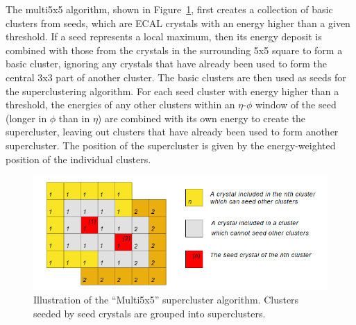 

The multi5x5 algorithm, 
shown in Figure~\ref{fig:Multi5x5SuperCluster}, 
first creates a collection 
of basic clusters from seeds, 
which are ECAL crystals with an energy higher than 
a given threshold.  
If a seed represents a local maximum, 
then its energy deposit is combined with those 
from the crystals in the surrounding 5x5 square 
to form a basic cluster, 
ignoring any crystals that have already been 
used to form the central 3x3 part of another cluster.  
The basic clusters are then used as seeds for the 
superclustering algorithm.  
For each seed cluster with energy higher than a threshold, 
the energies of any other clusters within an $\eta$-$\phi$ 
window of the seed (longer in $\phi$ than in $\eta$)
are combined with its own energy to create the supercluster, 
leaving out clusters that have already been used to 
form another supercluster. 
The position of the supercluster is given by the 
energy-weighted position of the individual clusters.  

 \begin{figure}[htb]
  \begin{center}
    \includegraphics[width=360pt]{Figures/elec-SC-multi5x5-algo.png}
  \end{center}
  \caption[\fixspacing Illustration of the ``Multi5x5'' supercluster algorithm]
	  {\fixspacing Illustration of the ``Multi5x5'' supercluster algorithm.
	    Clusters seeded by seed crystals are grouped into 
	    superclusters.  
	  }
  \label{fig:Multi5x5SuperCluster}
 \end{figure}



